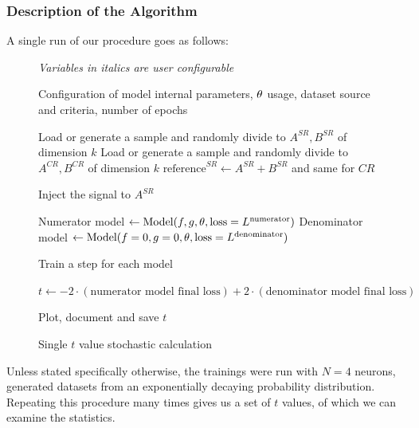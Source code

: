 \documentclass[../../ddppaper2.tex]{subfiles}
\begin{document}

\subsubsection{Description of the Algorithm}
A single run of our procedure goes as follows:

\begin{figure}
\caption{Single $t$ value stochastic calculation}
\label{alg:single_train_algorithm}
\begin{algorithmic}[1]

\Statex \textit{Variables in italics are user configurable}
\Statex %

\Require Configuration of model internal parameters, ${\theta}$ usage, dataset source and criteria, number of epochs

\State Load or generate a sample and randomly divide to $A^{SR}, B^{SR}$ of dimension $\mathit{k}$
\State Load or generate a sample and randomly divide to $A^{CR}, B^{CR}$ of dimension $\mathit{k}$
\State $\text{reference}^{SR} \gets A^{SR} + B^{SR}$ and same for $CR$

    \State Inject the signal to $A^{SR}$
\EndIf

\State Numerator model $\gets \text{Model}(f, g, {\theta}, \text{loss} = L^{\text{numerator}})$
\State Denominator model $\gets \text{Model}(f = 0, g = 0, {\theta}, \text{loss} = L^{\text{denominator}})$

    \State Train a step for each model
\EndFor

\State $t \gets -2 \cdot (\text{numerator model final loss}) + 2 \cdot (\text{denominator model final loss})$

\State Plot, document and save
\State \Return $t$

\end{algorithmic}
\end{figure}

Unless stated specifically otherwise, the trainings were run with $N=4$ neurons, generated datasets from an exponentially decaying probability distribution.
Repeating this procedure many times gives us a set of $t$ values, of which we can examine the statistics.
\end{document}
